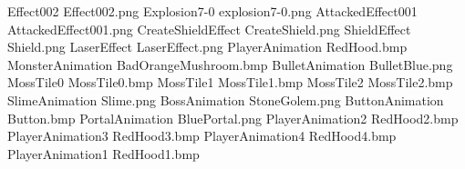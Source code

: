 Effect002
E f f e c t 0 0 2 . p n g 
 Explosion7-0
e x p l o s i o n 7 - 0 . p n g 
 AttackedEffect001
A t t a c k e d E f f e c t 0 0 1 . p n g 
 CreateShieldEffect
C r e a t e S h i e l d . p n g 
 ShieldEffect
S h i e l d . p n g 
 LaserEffect
L a s e r E f f e c t . p n g 
 PlayerAnimation
R e d H o o d . b m p 
 MonsterAnimation
B a d O r a n g e M u s h r o o m . b m p 
 BulletAnimation
B u l l e t B l u e . p n g 
 MossTile0
M o s s T i l e 0 . b m p 
 MossTile1
M o s s T i l e 1 . b m p 
 MossTile2
M o s s T i l e 2 . b m p 
 SlimeAnimation
S l i m e . p n g 
 BossAnimation
S t o n e G o l e m . p n g 
 ButtonAnimation
B u t t o n . b m p 
 PortalAnimation
B l u e P o r t a l . p n g 
 PlayerAnimation2
R e d H o o d 2 . b m p 
 PlayerAnimation3
R e d H o o d 3 . b m p 
 PlayerAnimation4
R e d H o o d 4 . b m p 
 PlayerAnimation1
R e d H o o d 1 . b m p 
 